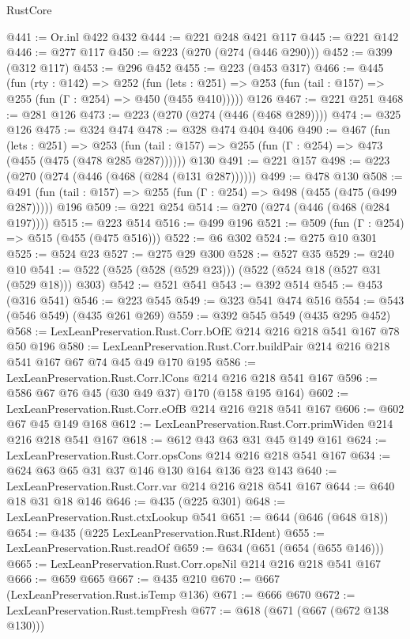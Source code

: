 \begin{lexlean}{RustCore}
\begin{coremodule}
@441 := Or.inl @422 @432
@444 := @221 @248 @421 @117
@445 := @221 @142
@446 := @277 @117
@450 := @223 (@270 (@274 (@446 @290)))
@452 := @399 (@312 @117)
@453 := @296 @452
@455 := @223 (@453 @317)
@466 := @445
    (fun (rty : @142) =>
    @252
      (fun (lets : @251) => @253 (fun (tail : @157) => @255 (fun (Γ : @254) => @450 (@455 @410)))))
    @126
@467 := @221 @251
@468 := @281 @126
@473 := @223 (@270 (@274 (@446 (@468 @289))))
@474 := @325 @126
@475 := @324 @474
@478 := @328 @474 @404 @406
@490 := @467
    (fun (lets : @251) =>
    @253 (fun (tail : @157) => @255 (fun (Γ : @254) => @473 (@455 (@475 (@478 @285 @287))))))
    @130
@491 := @221 @157
@498 := @223 (@270 (@274 (@446 (@468 (@284 (@131 @287))))))
@499 := @478 @130
@508 := @491 (fun (tail : @157) => @255 (fun (Γ : @254) => @498 (@455 (@475 (@499 @287))))) @196
@509 := @221 @254
@514 := @270 (@274 (@446 (@468 (@284 @197))))
@515 := @223 @514
@516 := @499 @196
@521 := @509 (fun (Γ : @254) => @515 (@455 (@475 @516)))
@522 := @6 @302
@524 := @275 @10 @301
@525 := @524 @23
@527 := @275 @29 @300
@528 := @527 @35
@529 := @240 @10
@541 := @522 (@525 (@528 (@529 @23))) (@522 (@524 @18 (@527 @31 (@529 @18))) @303)
@542 := @521 @541
@543 := @392 @514
@545 := @453 (@316 @541)
@546 := @223 @545
@549 := @323 @541 @474 @516
@554 := @543 (@546 @549) (@435 @261 @269)
@559 := @392 @545 @549 (@435 @295 @452)
@568 := LexLeanPreservation.Rust.Corr.bOfE @214 @216 @218 @541 @167 @78 @50 @196
@580 := LexLeanPreservation.Rust.Corr.buildPair @214 @216 @218 @541 @167 @67 @74 @45 @49 @170 @195
@586 := LexLeanPreservation.Rust.Corr.lCons @214 @216 @218 @541 @167
@596 := @586 @67 @76 @45 (@30 @49 @37) @170 (@158 @195 @164)
@602 := LexLeanPreservation.Rust.Corr.eOfB @214 @216 @218 @541 @167
@606 := @602 @67 @45 @149 @168
@612 := LexLeanPreservation.Rust.Corr.primWiden @214 @216 @218 @541 @167
@618 := @612 @43 @63 @31 @45 @149 @161
@624 := LexLeanPreservation.Rust.Corr.opsCons @214 @216 @218 @541 @167
@634 := @624 @63 @65 @31 @37 @146 @130 @164 @136 @23 @143
@640 := LexLeanPreservation.Rust.Corr.var @214 @216 @218 @541 @167
@644 := @640 @18 @31 @18 @146
@646 := @435 (@225 @301)
@648 := LexLeanPreservation.Rust.ctxLookup @541
@651 := @644 (@646 (@648 @18))
@654 := @435 (@225 LexLeanPreservation.Rust.RIdent)
@655 := LexLeanPreservation.Rust.readOf
@659 := @634 (@651 (@654 (@655 @146)))
@665 := LexLeanPreservation.Rust.Corr.opsNil @214 @216 @218 @541 @167
@666 := @659 @665
@667 := @435 @210
@670 := @667 (LexLeanPreservation.Rust.isTemp @136)
@671 := @666 @670
@672 := LexLeanPreservation.Rust.tempFresh
@677 := @618 (@671 (@667 (@672 @138 @130)))

\end{coremodule}
\end{lexlean}
